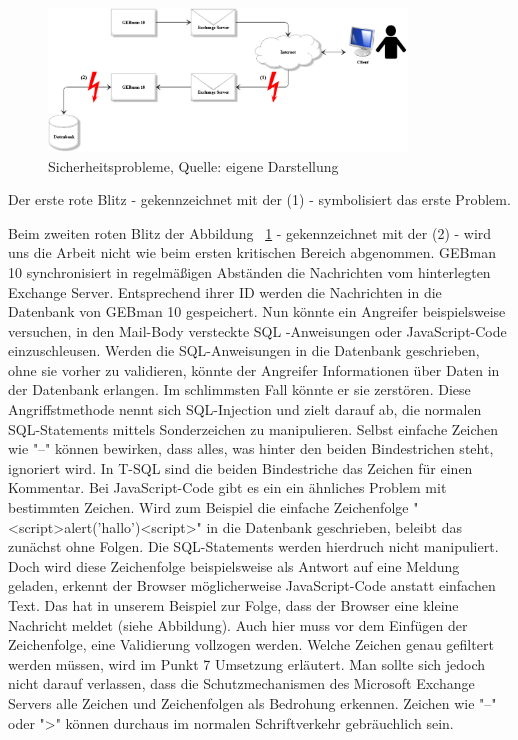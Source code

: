 \begin{figure}[h!]
\centering
\includegraphics[width=0.85\textwidth]{Abbildungen/Sicherheitsprobleme.png}
	\caption[Sicherheitsprobleme]{Sicherheitsprobleme, Quelle: eigene Darstellung}
	\label{fig:Sicherheitsprobleme}
\end{figure}

\noindent
Der erste rote Blitz - gekennzeichnet mit der (1) - symbolisiert das erste Problem.

\noindent
Beim zweiten roten Blitz der Abbildung ~\ref{fig:Sicherheitsprobleme} - gekennzeichnet mit der (2) - wird uns die Arbeit nicht wie beim ersten kritischen Bereich abgenommen. GEBman 10 synchronisiert in regelmäßigen Abständen die Nachrichten vom hinterlegten Exchange Server. Entsprechend ihrer ID werden die Nachrichten in die Datenbank von GEBman 10 gespeichert. Nun könnte ein Angreifer beispielsweise versuchen, in den Mail-Body versteckte SQL -Anweisungen oder JavaScript-Code einzuschleusen. Werden die SQL-Anweisungen in die Datenbank geschrieben, ohne sie vorher zu validieren, könnte der Angreifer Informationen über Daten in der Datenbank erlangen. Im schlimmsten Fall könnte er sie zerstören. Diese Angriffstmethode nennt sich SQL-Injection und zielt darauf ab, die normalen SQL-Statements mittels Sonderzeichen zu manipulieren. Selbst einfache Zeichen wie "--" können bewirken, dass alles, was hinter den beiden Bindestrichen steht, ignoriert wird. In T-SQL sind die beiden Bindestriche das Zeichen für einen Kommentar.
\noindent
Bei JavaScript-Code gibt es ein ein ähnliches Problem mit bestimmten Zeichen. Wird zum Beispiel die einfache Zeichenfolge "<script>alert('hallo')<script>" in die Datenbank geschrieben, beleibt das zunächst ohne Folgen. Die SQL-Statements werden hierdruch nicht manipuliert. Doch wird diese Zeichenfolge beispielsweise als Antwort auf eine Meldung geladen, erkennt der Browser möglicherweise JavaScript-Code anstatt einfachen Text. Das hat in unserem Beispiel zur Folge, dass der Browser eine kleine Nachricht meldet (siehe Abbildung).
Auch hier muss vor dem Einfügen der Zeichenfolge, eine Validierung vollzogen werden. Welche Zeichen genau gefiltert werden müssen, wird im Punkt 7 Umsetzung erläutert. Man sollte sich jedoch nicht darauf verlassen, dass die Schutzmechanismen des Microsoft Exchange Servers alle Zeichen und Zeichenfolgen als Bedrohung erkennen. Zeichen wie "--" oder ">" können durchaus im normalen Schriftverkehr gebräuchlich sein.
\noindent
 

